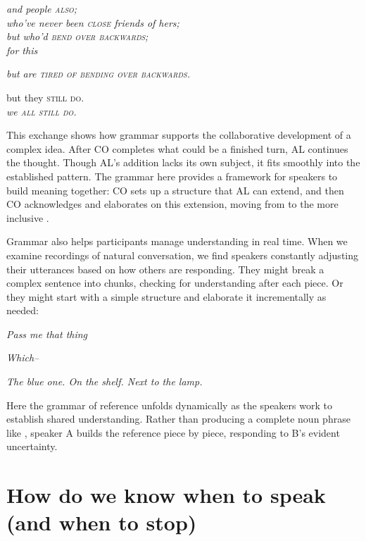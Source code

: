 \ea 
\begin{dialogue}
   \item[CO] \emph{and people \textsc{also};} \\
   \emph{who've never been \textsc{close} friends of hers;} \\
   \emph{but who'd \textsc{bend over backwards};} \\
   \emph{for this }
   \item[AL] \emph{but are \textsc{tired of bending over backwards.}}
   \item[CO] but they \textsc{still do.} \\
   \emph{we \textsc{all still do.}}
\end{dialogue}
\z
This exchange shows how grammar supports the collaborative development of a complex idea. After CO completes what could be a finished turn, AL continues the thought. Though AL's addition lacks its own subject, it fits smoothly into the established pattern. The grammar here provides a framework for speakers to build meaning together: CO sets up a structure that AL can extend, and then CO acknowledges and elaborates on this extension, moving from  to the more inclusive .

Grammar also helps participants manage understanding in real time. When we examine recordings of natural conversation, we find speakers constantly adjusting their utterances based on how others are responding. They might break a complex sentence into chunks, checking for understanding after each piece. Or they might start with a simple structure and elaborate it incrementally as needed:

\ea
\begin{dialogue}
\item[A] \emph{Pass me that thing}
\item[B] \emph{Which--}
\item[A] \emph{The blue one. On the shelf. Next to the lamp.}
\end{dialogue}
\z
Here the grammar of reference unfolds dynamically as the speakers work to establish shared understanding. Rather than producing a complete noun phrase like , speaker A builds the reference piece by piece, responding to B's evident uncertainty.

\section{How do we know when to speak (and when to stop)} \label{sec:turn-arch}

